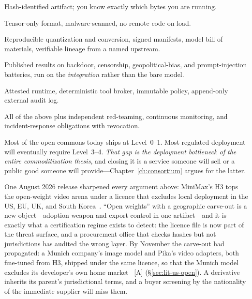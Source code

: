 \begin{description}\itemsep2pt
  \item[Level 0 --- Identified.] Hash-identified artifact; you know exactly which bytes you are running.
  \item[Level 1 --- Non-executable.] Tensor-only format, malware-scanned, no remote code on load.
  \item[Level 2 --- Provenanced.] Reproducible quantization and conversion, signed manifests, model bill of materials, verifiable lineage from a named upstream.
  \item[Level 3 --- Behaviourally evaluated.] Published results on backdoor, censorship, geopolitical-bias, and prompt-injection batteries, run on the \emph{integration} rather than the bare model.
  \item[Level 4 --- Operationally contained.] Attested runtime, deterministic tool broker, immutable policy, append-only external audit log.
  \item[Level 5 --- Critical-infrastructure assured.] All of the above plus independent red-teaming, continuous monitoring, and incident-response obligations with revocation.
\end{description}

Most of the open commons today ships at Level~0--1. Most regulated deployment will eventually require Level~3--4. \emph{That gap is the deployment bottleneck of the entire commoditization thesis}, and closing it is a service someone will sell or a public good someone will provide---Chapter~\ref{ch:consortium} argues for the latter.

One August 2026 release sharpened every argument above: MiniMax's H3 tops the open-weight video arena under a licence that excludes local deployment in the US, EU, UK, and South Korea~\cite{minimax-geofence}. ``Open weights'' with a geographic carve-out is a new object---adoption weapon and export control in one artifact---and it is exactly what a certification regime exists to detect: the licence file is now part of the threat surface, and a procurement office that checks hashes but not jurisdictions has audited the wrong layer. By November the carve-out had propagated: a Munich company's image model and Pika's video adapters, both fine-tuned from H3, shipped under the same licence, so that the Munich model excludes its developer's own home market~\cite{lit-pruna,lit-pika} [A] (\S\ref{sec:lit-us-open}). A derivative inherits its parent's jurisdictional terms, and a buyer screening by the nationality of the immediate supplier will miss them.

